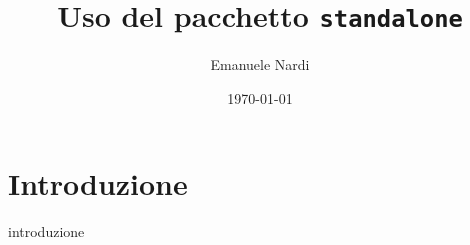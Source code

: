 \documentclass{article}
\title{Uso del pacchetto \texttt{standalone}}
\author{Emanuele Nardi}
\date{\today}
\begin{document}
\maketitle

\section{Introduzione}
{introduzione}

\end{document}
